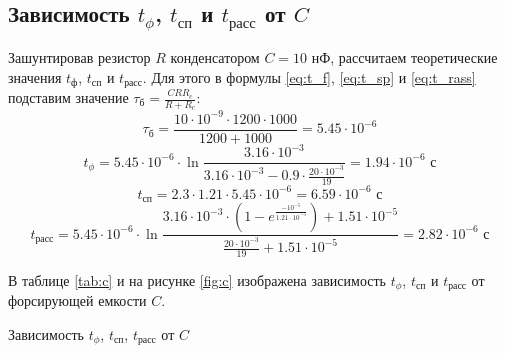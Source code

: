 \documentclass[a4paper,14pt]{extarticle}
\begin{document}
\subsection{Зависимость $t_\phi$, $t_\text{сп}$ и $t_\text{расс}$ от $C$}

Зашунтировав резистор $R$ конденсатором $C = 10$ нФ, рассчитаем теоретические значения $t_\text{ф}$, $t_\text{сп}$ и $t_\text{расс}$. Для этого в формулы \ref{eq:t_f}, \ref{eq:t_sp} и \ref{eq:t_rass} подставим значение $\tau_\text{б} = \frac{CRR_c}{R+R_c}$:
\[
\tau_\text{б} = \frac{10 \cdot 10^{-9} \cdot 1200 \cdot 1000}{1200 + 1000} = 5.45 \cdot 10^{-6}
\]
\[
t_\phi = 5.45 \cdot 10^{-6} \cdot \ln{\frac{3.16 \cdot 10^{-3}}{3.16 \cdot 10^{-3} - 0.9 \cdot \frac{20 \cdot 10^{-3}}{19}}} = 1.94 \cdot 10^{-6} \text{ с}
\]
\[
t_\text{сп} = 2.3 \cdot 1.21 \cdot 5.45 \cdot 10^{-6} = 6.59 \cdot 10^{-6} \text{ с}
\]
\[
t_\text{расс} = 5.45 \cdot 10^{-6} \cdot \ln{\frac{3.16 \cdot 10^{-3} \cdot \left( 1 - e^{\frac{-10^{-5}}{1.21 \cdot 10^{-5}}} \right) + 1.51 \cdot 10^{-5}}{\frac{20 \cdot 10^{-3}}{19} + 1.51 \cdot 10^{-5}}} = 2.82 \cdot 10^{-6} \text{ с}
\]

В таблице \ref{tab:c} и на рисунке \ref{fig:c} изображена зависимость $t_\phi$, $t_\text{сп}$ и $t_\text{расс}$ от форсирующей емкости $C$.

\begin{table}[H]
\begin{center}
	\caption{Зависимость $t_\phi$, $t_\text{сп}$, $t_\text{расс}$ от $C$}\label{tab:c}
	\def\tabcolsep{17pt}
\end{center}
\end{table}
\end{document}
